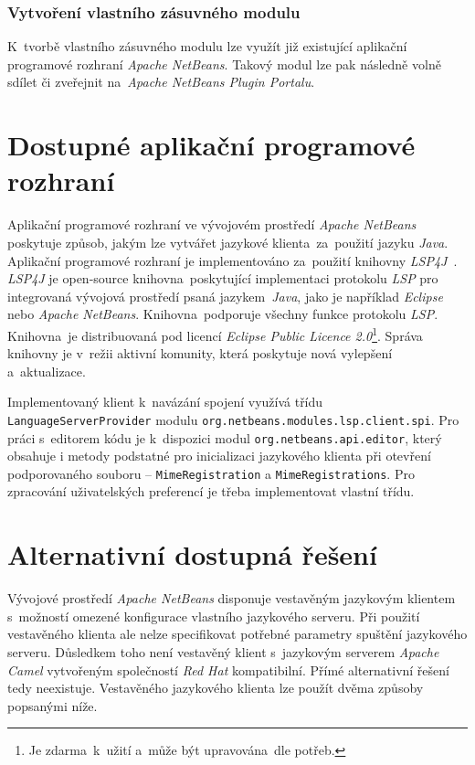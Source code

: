 \subsubsection{Vytvoření vlastního zásuvného modulu}
K~tvorbě vlastního zásuvného modulu lze využít již existující aplikační programové rozhraní \emph{Apache NetBeans}. Takový modul lze pak následně volně sdílet či zveřejnit na~\emph{Apache NetBeans Plugin Portalu}.

\section{Dostupné aplikační programové rozhraní}
Aplikační programové rozhraní ve vývojovém prostředí \emph{Apache NetBeans} poskytuje způsob, jakým lze vytvářet jazykové klienta~za~použití jazyku \emph{Java}. Aplikační programové rozhraní je implementováno za~použití knihovny \emph{LSP4J}~\cite{EclipseLSP4J}. \emph{LSP4J} je open-source knihovna~poskytující implementaci protokolu \emph{LSP} pro integrovaná vývojová prostředí psaná jazykem~\emph{Java}, jako je například \emph{Eclipse} nebo \emph{Apache NetBeans}. Knihovna~podporuje všechny funkce protokolu \emph{LSP}. Knihovna~je distribuovaná pod licencí \emph{Eclipse Public Licence 2.0}\footnote{Je zdarma~k~užití a~může být upravována~dle potřeb.}. Správa knihovny je v~režii aktivní komunity, která poskytuje nová vylepšení a~aktualizace. 

Implementovaný klient k~navázání spojení využívá třídu \texttt{LanguageServerProvider} modulu \texttt{org.netbeans.modules.lsp.client.spi}. Pro práci s~editorem kódu je k~dispozici modul \texttt{org.netbeans.api.editor}, který obsahuje i metody podstatné pro inicializaci jazykového klienta při otevření podporovaného souboru -- \texttt{MimeRegistration} a \texttt{MimeRegistrations}. Pro zpracování uživatelských preferencí je třeba implementovat vlastní třídu.

\section{Alternativní dostupná řešení}
\label{alternativniDostupnaReseni}
Vývojové prostředí \emph{Apache NetBeans} disponuje vestavěným jazykovým klientem s~možností omezené konfigurace vlastního jazykového serveru. Při použití vestavěného klienta ale nelze specifikovat potřebné parametry spuštění jazykového serveru. Důsledkem toho není vestavěný klient s~jazykovým serverem \emph{Apache Camel} vytvořeným společností \emph{Red Hat} kompatibilní. Přímé alternativní řešení tedy neexistuje. Vestavěného jazykového klienta lze použít dvěma způsoby popsanými níže.

